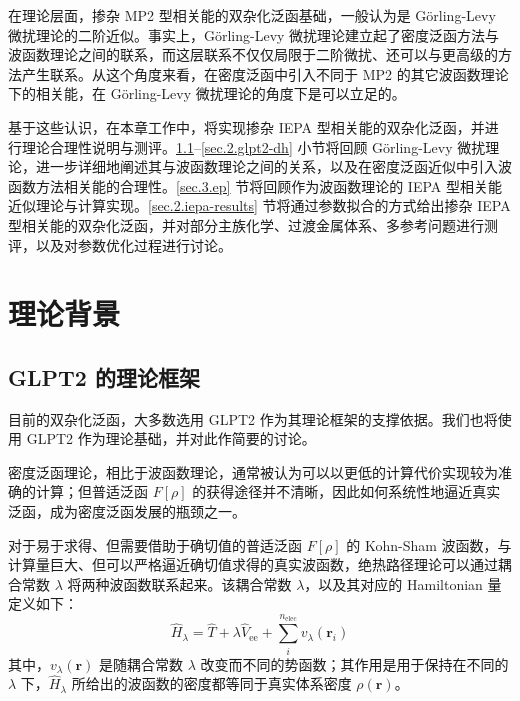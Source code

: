 在理论层面，掺杂 MP2 型相关能的双杂化泛函基础，一般认为是 G\"orling-Levy 微扰理论的二阶近似。事实上，G\"orling-Levy 微扰理论建立起了密度泛函方法与波函数理论之间的联系，而这层联系不仅仅局限于二阶微扰、还可以与更高级的方法产生联系。从这个角度来看，在密度泛函中引入不同于 MP2 的其它波函数理论下的相关能，在 G\"orling-Levy 微扰理论的角度下是可以立足的。

基于这些认识，在本章工作中，将实现掺杂 IEPA 型相关能的双杂化泛函，并进行理论合理性说明与测评。\ref{sec.2.glpt2-theory}--\ref{sec.2.glpt2-dh} 小节将回顾 G\"orling-Levy 微扰理论，进一步详细地阐述其与波函数理论之间的关系，以及在密度泛函近似中引入波函数方法相关能的合理性。\ref{sec.3.ep} 节将回顾作为波函数理论的 IEPA 型相关能近似理论与计算实现。\ref{sec.2.iepa-results} 节将通过参数拟合的方式给出掺杂 IEPA 型相关能的双杂化泛函，并对部分主族化学、过渡金属体系、多参考问题进行测评，以及对参数优化过程进行讨论。

\section{理论背景}

\subsection{GLPT2 的理论框架}
\label{sec.2.glpt2-theory}

目前的双杂化泛函，大多数选用 GLPT2 作为其理论框架的支撑依据。我们也将使用 GLPT2 作为理论基础，并对此作简要的讨论。

密度泛函理论，相比于波函数理论，通常被认为可以以更低的计算代价实现较为准确的计算；但普适泛函 $F[\rho]$ 的获得途径并不清晰，因此如何系统性地逼近真实泛函，成为密度泛函发展的瓶颈之一。

对于易于求得、但需要借助于确切值的普适泛函 $F[\rho]$ 的 Kohn-Sham 波函数，与计算量巨大、但可以严格逼近确切值求得的真实波函数，绝热路径理论可以通过耦合常数 $\lambda$ 将两种波函数联系起来。该耦合常数 $\lambda$，以及其对应的 Hamiltonian 量定义如下：
\begin{equation}
  \label{eq.2.H-lambda-ac}
  \hat H_\lambda = \hat T + \lambda \hat V_\mathrm{ee} + \sum_i^{n_\mathrm{elec}} v_{\lambda}(\bm{r}_i)
\end{equation}
其中，$v_{\lambda}(\bm{r})$ 是随耦合常数 $\lambda$ 改变而不同的势函数；其作用是用于保持在不同的 $\lambda$ 下，$\hat H_\lambda$ 所给出的波函数的密度都等同于真实体系密度 $\rho(\bm{r})$。


